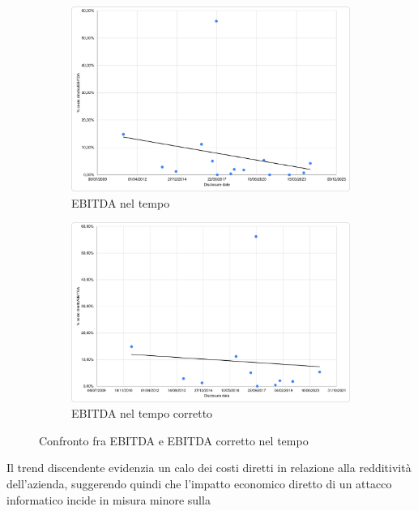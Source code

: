 \documentclass[12pt,a4paper,twoside]{report}
\begin{document}
\begin{figure}[H]
    \centering
    \begin{subfigure}{0.48\textwidth}
        \centering
        \includegraphics[width=1\linewidth]{figures/ebit-date-1.png}
        \caption[Grafico linearizzato EBITDA]{EBITDA nel tempo}
        \label{fig:ebit1}
    \end{subfigure}
    \begin{subfigure}{0.48\textwidth}
        \centering
    \includegraphics[width=1\linewidth]{figures/ebit-date-2.png}
    \caption[Grafico linearizzato EBITDA corretto]{EBITDA nel tempo corretto}
    \label{fig:ebit2}
    \end{subfigure}
    \caption[Confronto EBITDA]{Confronto fra EBITDA e EBITDA corretto nel tempo}
\end{figure}
Il trend discendente evidenzia un calo dei costi diretti in relazione alla redditivit\`a dell'azienda, 
suggerendo quindi che l'impatto economico diretto di un attacco informatico incide in misura minore sulla 
\end{document}
